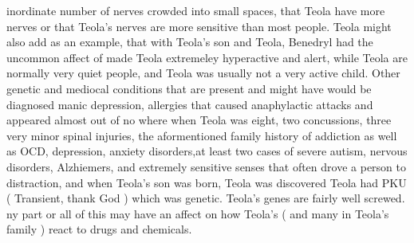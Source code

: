 \documentclass[12pt]{book}
\begin{document}
inordinate number of nerves crowded into small spaces, that Teola have more nerves or that Teola's nerves are more sensitive than most people. Teola might also add as an example, that with Teola's son and Teola, Benedryl had the uncommon affect of made Teola extremeley hyperactive and alert, while Teola are normally very quiet people, and Teola was usually not a very active child. Other genetic and mediocal conditions that are present and might have  would be diagnosed manic depression, allergies that caused anaphylactic attacks and appeared almost out of no where when Teola was eight, two concussions, three very minor spinal injuries, the aformentioned family history of addiction as well as OCD, depression, anxiety disorders,at least two cases of severe autism, nervous disorders, Alzhiemers, and extremely sensitive senses that often drove a person to distraction, and when Teola's son was born, Teola was discovered Teola had PKU ( Transient, thank God ) which was genetic. Teola's genes are fairly well screwed. ny part or all of this may have an affect on how Teola's ( and many in Teola's family ) react to drugs and chemicals.
\end{document}

